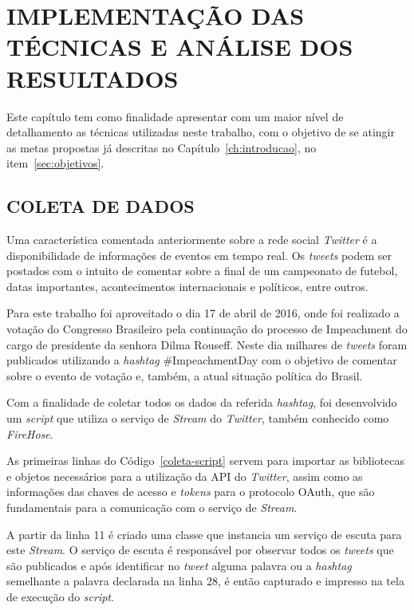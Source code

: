 \chapter{IMPLEMENTAÇÃO DAS TÉCNICAS E ANÁLISE DOS RESULTADOS}\label{ch:implementacao}

Este capítulo tem como finalidade apresentar com um maior nível de detalhamento as técnicas utilizadas neste trabalho, com o objetivo de se atingir as metas propostas já descritas no Capítulo~\ref{ch:introducao}, no item~\ref{sec:objetivos}.

\section{COLETA DE DADOS}
Uma característica comentada anteriormente sobre a rede social \textit{Twitter} é a disponibilidade de informações de eventos em tempo real. Os \textit{tweets} podem ser postados com o intuito de comentar sobre a final de um campeonato de futebol, datas importantes, acontecimentos internacionais e políticos, entre outros.

Para este trabalho foi aproveitado o dia 17 de abril de 2016, onde foi realizado a votação do Congresso Brasileiro pela continuação do processo de Impeachment do cargo de presidente da senhora Dilma Rouseff. Neste dia milhares de \textit{tweets} foram publicados utilizando a \textit{hashtag} \#ImpeachmentDay com o objetivo de comentar sobre o evento de votação e, também, a atual situação política do Brasil.

Com a finalidade de coletar todos os dados da referida \textit{hashtag}, foi desenvolvido um \textit{script} que utiliza o serviço de \textit{Stream} do \textit{Twitter}, também conhecido como \textit{FireHose}.

As primeiras linhas do Código~\ref{coleta-script} servem para importar as bibliotecas e objetos necessários para a utilização da API do \textit{Twitter}, assim como as informações das chaves de acesso e \textit{tokens} para o protocolo OAuth, que são fundamentais para a comunicação com o serviço de \textit{Stream}.



A partir da linha 11 é criado uma classe que instancia um serviço de escuta para este \textit{Stream}. O serviço de escuta é responsável por observar todos os \textit{tweets} que são publicados e após identificar no \textit{tweet} alguma palavra ou a \textit{hashtag} semelhante a palavra declarada na linha 28, é então capturado e impresso na tela de execução do \textit{script}.

